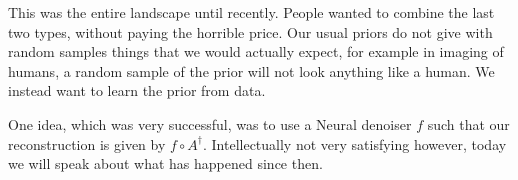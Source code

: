 \documentclass[12pt]{article}
\theoremstyle{definition}
\begin{document}
This was the entire landscape until recently. People wanted to combine the last two types, without paying the horrible price. Our usual priors do not give with random samples things that we would actually expect, for example in imaging of humans, a random sample of the prior will not look anything like a human. We instead want to learn the prior from data.

One idea, which was very successful, was to use a Neural denoiser $f$ such that our reconstruction is given by $f\circ A^\dagger$. Intellectually not very satisfying however, today we will speak about what has happened since then.
\end{document}
